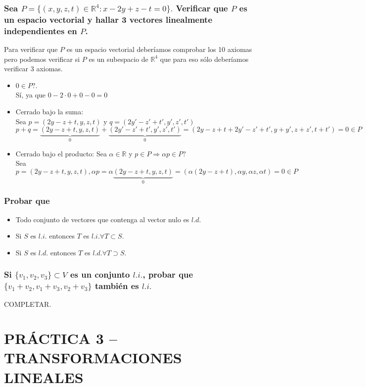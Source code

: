 \documentclass{article}
\begin{document}
\subsubsection{Sea $P = \{ (x,y,z,t) \in \mathbb{R}^4 : x-2y+z-t = 0\}.$ Verificar que $P$ es un espacio vectorial
y hallar 3 vectores linealmente independientes en $P$.}
Para verificar que $P$ es un espacio vectorial deberíamos comprobar los 10 axiomas pero podemos verificar si
$P$ es un subespacio de $\mathbb{R}^4$ que para eso sólo deberíamos verificar 3 axiomas. \\
\begin{itemize}
	\item
		$0 \in P?$. \\
		Sí, ya que $0-2 \cdot 0+0-0=0$
	\item
		Cerrado bajo la suma: \\
		Sea $p = (2y-z+t,y,z,t)$ y $q = (2y'-z'+t',y',z',t')$ \\
		$p+q = \underbrace{(2y-z+t,y,z,t)}_{0} + \underbrace{(2y'-z'+t',y',z',t')}_{0} = (2y-z+t+2y'-z'+t',y+y',z+z',t+t') = 0
		\in P$
	\item
		Cerrado bajo el producto:
		Sea $\alpha \in \mathbb{R}$ y $p \in P \Rightarrow \alpha p \in P?$\\
		Sea $p=(2y-z+t,y,z,t), 
		\alpha p = \alpha \underbrace{(2y-z+t,y,z,t)}_{0} = (\alpha(2y-z+t),\alpha y, \alpha z, \alpha t) = 0\in P $
\end{itemize}
\subsubsection{Probar que}
\begin{itemize}
	\item
		Todo conjunto de vectores que contenga al vector nulo es $l.d.$
	\item
		Si $S$ es $l.i.$ entonces $T$ es $l.i. \forall T \subset S$.
	\item
		Si $S$ es $l.d.$ entonces $T$ es $l.d. \forall T \supset S$. 
\end{itemize}
\subsubsection{Si $\{ v_1,v_2,v_3 \} \subset V$ es un conjunto $l.i.$, probar que $\{ v_1+v_2,v_1+v_3,v_2+v_3 \}$ también es
$l.i.$}
COMPLETAR.
\section{PRÁCTICA 3 -- TRANSFORMACIONES LINEALES}
\end{document}
